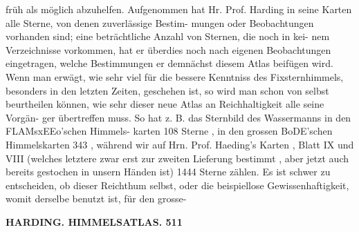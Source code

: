 \documentclass[12pt,a4paper]{article}
\begin{document}
früh  als  möglich  abzuhelfen. Aufgenommen  hat  Hr.  Prof.  Harding  in  seine  Karten  alle  Sterne,  von  denen  zuverlässige  Bestim- mungen oder  Beobachtungen  vorhanden  sind;  eine  beträchtliche  Anzahl  von  Sternen,  die  noch  in  kei- nem Verzeichnisse  vorkommen,  hat  er  überdies  noch  nach  eigenen  Beobachtungen  eingetragen,  welche Bestimmungen  er  demnächst  diesem  Atlas  beifügen  wird.  Wenn  man  erwägt,  wie  sehr  viel  für  die bessere  Kenntniss  des  Fixsternhimmels,  besonders  in  den  letzten  Zeiten,  geschehen  ist,  so  wird  man schon  von  selbst  beurtheilen  können,  wie  sehr  dieser  neue  Atlas  an  Reichhaltigkeit  alle  seine  Vorgän- ger übertreffen  muss.  So  hat  z.  B.  das  Sternbild  des  Wassermanns  in  den  FLAMsxEEo'schen  Himmels- karten 108  Sterne ,  in  den  grossen  BoDE'schen  Himmelskarten  343 ,  während  wir  auf  Hrn.  Prof.  Haeding's Karten ,  Blatt  IX  und  VIII  (welches  letztere  zwar  erst  zur  zweiten  Lieferung  bestimmt ,  aber  jetzt  auch bereits  gestochen  in  unsern  Händen  ist)  1444  Sterne  zählen.  Es  ist  schwer  zu  entscheiden,  ob  dieser Reichthum  selbst,  oder  die  beispiellose  Gewissenhaftigkeit,  womit  derselbe  benutzt  ist,   für  den  grosse-

\vspace{0.5em}


\noindent\textbf{HARDING.     HIMMELSATLAS.  511}
\end{document}
